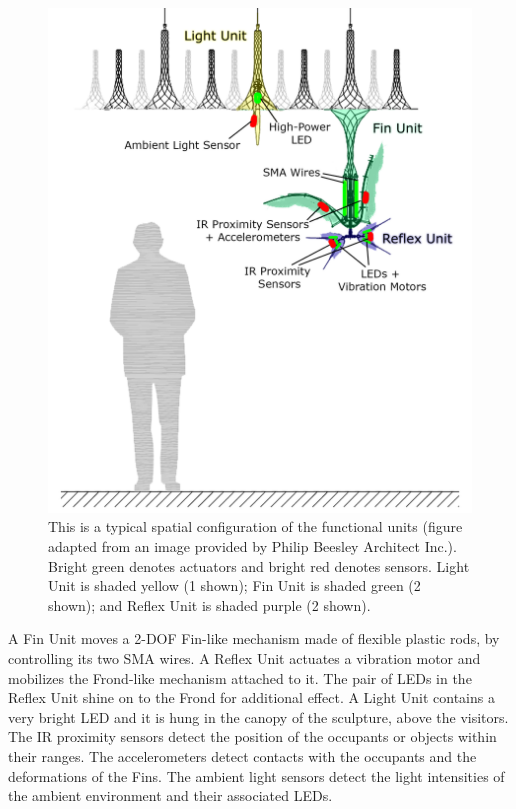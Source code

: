 \begin{figure}[!htbp]
	\centering
	\includegraphics[height=0.85 \textheight]{"fig/interactive control system/Physical hardware"}
	\caption[Typical spatial configuration of the physical functional units]{This is a typical spatial configuration of the functional units (figure adapted from an image provided by Philip Beesley Architect Inc.). Bright green denotes actuators and bright red denotes sensors. Light Unit is shaded yellow (1 shown); Fin Unit is shaded green (2 shown); and Reflex Unit is shaded purple (2 shown).}
	\label{fig:Physical hardware}
\end{figure}

A Fin Unit moves a 2-DOF Fin-like mechanism made of flexible plastic rods, by controlling its two SMA wires. A Reflex Unit actuates a vibration motor and mobilizes the Frond-like mechanism attached to it. The pair of LEDs in the Reflex Unit shine on to the Frond for additional effect. A Light Unit contains a very bright LED and it is hung in the canopy of the sculpture, above the visitors. The IR proximity sensors detect the position of the occupants or objects within their ranges. The accelerometers detect contacts with the occupants and the deformations of the Fins. The ambient light sensors detect the light intensities of the ambient environment and their associated LEDs. 


